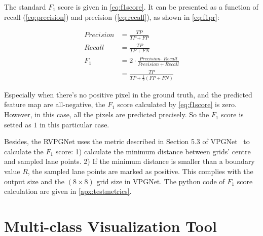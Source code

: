 \begin{spacing}{1.5}
The standard $F_1$ score is given in \autoref{eq:f1score}. It can be presented as a function of recall (\autoref{eq:precision}) and precision (\autoref{eq:recall}), as shown in \autoref{eq:f1pr}:

\begin{alignat}{2}
    Precision &= \frac{TP}{TP+FP} \label{eq:precision}\\
    Recall &= \frac{TP}{TP+FN} \label{eq:recall}\\
    F_1 &= 2\cdot \frac{Precision \cdot Recall}{Precision + Recall} \label{eq:f1pr}\\
     &=\frac{TP}{TP+\frac{1}{2}(FP+FN)} \label{eq:f1score}
\end{alignat}

Especially when there's no positive pixel in the ground truth, and the predicted feature map are all-negative, the $F_1$ score calculated by \autoref{eq:f1score} is zero. However, in this case, all the pixels are predicted precisely. So the $F_1$ score is setted as $1$ in this particular case.

Besides, the RVPGNet uses the metric described in Section 5.3 of VPGNet~\cite{lee2017vpgnet} to calculate the $F_1$ score: 1) calculate the minimum distance between grids' centre and sampled lane points. 2) If the minimum distance is smaller than a boundary value $R$, the sampled lane points are marked as positive. This complies with the output size and the $(8 \times 8)$ grid size in VPGNet. The python code of $F_1$ score calculation are given in \autoref{apx:testmetrics}.

\section{Multi-class Visualization Tool}
\label{sec:EX_multivisual}


\end{spacing}
